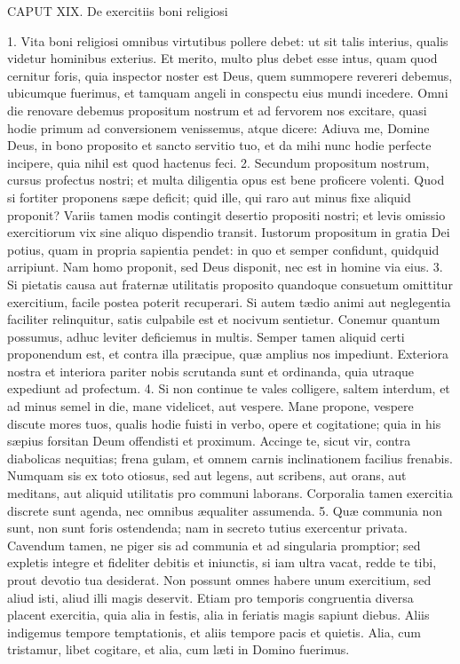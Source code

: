 \documentclass[twoside]{article}
\begin{document}
CAPUT XIX.
De exercitiis boni religiosi

1. Vita boni religiosi omnibus virtutibus pollere debet: ut sit talis interius, qualis videtur hominibus exterius. Et merito, multo plus debet esse intus, quam quod cernitur foris, quia inspector noster est Deus, quem summopere revereri debemus, ubicumque fuerimus, et tamquam angeli in conspectu eius mundi incedere. Omni die renovare debemus propositum nostrum et ad fervorem nos excitare, quasi hodie primum ad conversionem venissemus, atque dicere: Adiuva me, Domine Deus, in bono proposito et sancto servitio tuo, et da mihi nunc hodie perfecte incipere, quia nihil est quod hactenus feci.
2. Secundum propositum nostrum, cursus profectus nostri; et multa diligentia opus est bene proficere volenti. Quod si fortiter proponens sæpe deficit; quid ille, qui raro aut minus fixe aliquid proponit? Variis tamen modis contingit desertio propositi nostri; et levis omissio exercitiorum vix sine aliquo dispendio transit. Iustorum propositum in gratia Dei potius, quam in propria sapientia pendet: in quo et semper confidunt, quidquid arripiunt. Nam homo proponit, sed Deus disponit, nec est in homine via eius.
3. Si pietatis causa aut fraternæ utilitatis proposito quandoque consuetum omittitur exercitium, facile postea poterit recuperari. Si autem tædio animi aut neglegentia faciliter relinquitur, satis culpabile est et nocivum sentietur. Conemur quantum possumus, adhuc leviter deficiemus in multis. Semper tamen aliquid certi proponendum est, et contra illa præcipue, quæ amplius nos impediunt. Exteriora nostra et interiora pariter nobis scrutanda sunt et ordinanda, quia utraque expediunt ad profectum.
4. Si non continue te vales colligere, saltem interdum, et ad minus semel in die, mane videlicet, aut vespere. Mane propone, vespere discute mores tuos, qualis hodie fuisti in verbo, opere et cogitatione; quia in his sæpius forsitan Deum offendisti et proximum. Accinge te, sicut vir, contra diabolicas nequitias; frena gulam, et omnem carnis inclinationem facilius frenabis. Numquam sis ex toto otiosus, sed aut legens, aut scribens, aut orans, aut meditans, aut aliquid utilitatis pro communi laborans. Corporalia tamen exercitia discrete sunt agenda, nec omnibus æqualiter assumenda.
5. Quæ communia non sunt, non sunt foris ostendenda; nam in secreto tutius exercentur privata. Cavendum tamen, ne piger sis ad communia et ad singularia promptior; sed expletis integre et fideliter debitis et iniunctis, si iam ultra vacat, redde te tibi, prout devotio tua desiderat. Non possunt omnes habere unum exercitium, sed aliud isti, aliud illi magis deservit. Etiam pro temporis congruentia diversa placent exercitia, quia alia in festis, alia in feriatis magis sapiunt diebus. Aliis indigemus tempore temptationis, et aliis tempore pacis et quietis. Alia, cum tristamur, libet cogitare, et alia, cum læti in Domino fuerimus.
\end{document}
